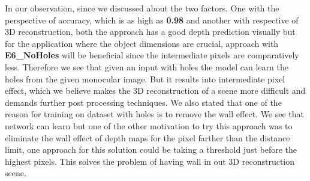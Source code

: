 In our observation, since we discussed about the two factors. One with the perspective of accuracy, which is as high as \textbf{0.98} and another with respective of 3D reconstruction, both the approach has a good depth prediction visually but for the application where the object dimensions are crucial, approach with \textbf{E6\_NoHoles} will be beneficial since the intermediate pixels are comparatively less. 
Therefore we see that given an input with holes the model can learn the holes from the given monocular image. But it results into intermediate pixel effect, which we believe makes the 3D reconstruction of a scene more difficult and demands further post processing techniques. We also stated that one of the reason for training on dataset with holes is to remove the wall effect. We see that network can learn but one of the other motivation to try this approach was to eliminate the wall effect of depth maps for the pixel farther than the distance limit, one approach for this solution could be taking a threshold just before the highest pixels. This solves the problem of having wall in out 3D reconstruction scene.\\


